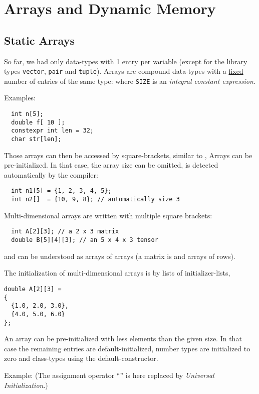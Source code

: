 \section{Arrays and Dynamic Memory}
\subsection{Static Arrays}
So far, we had only data-types with 1 entry per variable (except for the library types \texttt{vector}, \texttt{pair} and \texttt{tuple}).
Arrays are compound data-types with a \underline{fixed} number of entries of the same type:
%
%
where \texttt{SIZE} is an \emph{integral constant expression}.

Examples:
\begin{verbatim}
  int n[5];
  double f[ 10 ];
  constexpr int len = 32;
  char str[len];
\end{verbatim}
%
Those arrays can then be accessed by square-brackets, similar to , \eg
%
%
Arrays can be pre-initialized. In that case, the array size can be omitted, \ie is detected
automatically by the compiler:
\begin{verbatim}
  int n1[5] = {1, 2, 3, 4, 5};
  int n2[]  = {10, 9, 8}; // automatically size 3
\end{verbatim}

Multi-dimensional arrays are written with multiple square brackets:
%
\begin{verbatim}
  int A[2][3]; // a 2 x 3 matrix
  double B[5][4][3]; // an 5 x 4 x 3 tensor
\end{verbatim}
%
and can be understood as arrays of arrays (a matrix is and arrays of rows).

The initialization of multi-dimensional arrays is by lists of initializer-lists, \eg
%
\begin{verbatim}
double A[2][3] =
{
  {1.0, 2.0, 3.0},
  {4.0, 5.0, 6.0}
};
\end{verbatim}

\begin{rem}
  An array can be pre-initialized with less elements than the given size. In that case the remaining entries are default-initialized, \ie
  number types are initialized to zero and class-types using the default-constructor.

  Example:
  (The assignment operator ``\cpp{=}'' is here replaced by \textit{Universal Initialization}.)
\end{rem}

